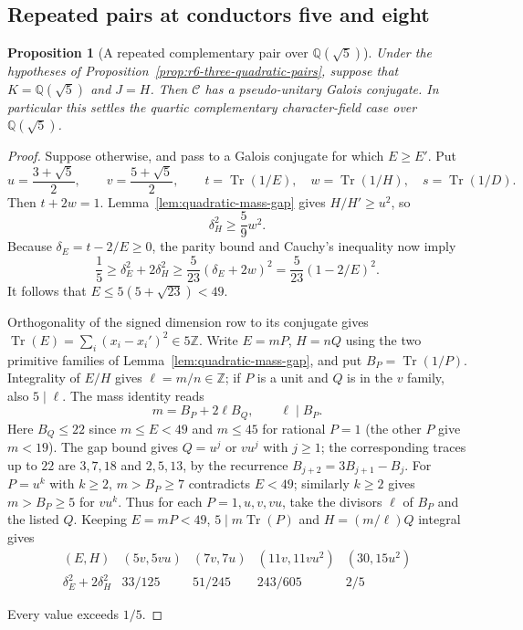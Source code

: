 \documentclass[11pt,reqno]{amsart}
\newtheorem{proposition}[theorem]{Proposition}
\theoremstyle{remark}\newtheorem{remark}[theorem]{Remark}
\numberwithin{equation}{section}
\begin{document}
\subsection{Repeated pairs at conductors five and eight}
\begin{proposition}[A repeated complementary pair over $\mathbb Q(\sqrt5)$]
\label{prop:r6-repeated-pair-five}
Under the hypotheses of Proposition~\ref{prop:r6-three-quadratic-pairs},
suppose that $K=\mathbb Q(\sqrt5)$ and $J=H$.
Then $\mathcal C$ has a pseudo-unitary Galois conjugate.
In particular this settles the quartic complementary character-field
case over $\mathbb Q(\sqrt5)$.
\end{proposition}
\begin{proof}
Suppose otherwise, and pass to a Galois conjugate for which $E\ge E'$.
Put
\[
 u=\frac{3+\sqrt5}{2},\qquad v=\frac{5+\sqrt5}{2},\qquad
 t=\operatorname{Tr}(1/E),\quad w=\operatorname{Tr}(1/H),\quad
 s=\operatorname{Tr}(1/D).
\]
Then $t+2w=1$. Lemma~\ref{lem:quadratic-mass-gap} gives
$H/H'\ge u^2$, so
\[
 \delta_H^2\ge\frac59w^2.
\]
Because $\delta_E=t-2/E\ge0$, the parity bound and Cauchy's inequality
now imply
\[
 \frac15\ge\delta_E^2+2\delta_H^2
 \ge\frac5{23}(\delta_E+2w)^2
 =\frac5{23}(1-2/E)^2.
\]
It follows that $E\le5(5+\sqrt{23})<49$.

Orthogonality of the signed dimension row to its conjugate gives
$\operatorname{Tr}(E)=\sum_i(x_i-x_i')^2\in5\mathbb Z$.
Write $E=mP$, $H=nQ$ using the two primitive families of
Lemma~\ref{lem:quadratic-mass-gap}, and put $B_P=\operatorname{Tr}(1/P)$.
Integrality of $E/H$ gives $\ell=m/n\in\mathbb Z$; if $P$ is a
unit and $Q$ is in the $v$ family, also $5\mid\ell$. The mass
identity reads
\[
     m=B_P+2\ell B_Q,\qquad \ell\mid B_P.
\]
Here $B_Q\le22$ since $m\le E<49$ and $m\le45$ for rational $P=1$
(the other $P$ give $m<19$). The gap bound gives $Q=u^j$ or
$vu^j$ with $j\ge1$; the corresponding traces up to $22$ are
$3,7,18$ and $2,5,13$, by the recurrence $B_{j+2}=3B_{j+1}-B_j$.
For $P=u^k$ with $k\ge2$, $m>B_P\ge7$ contradicts $E<49$;
similarly $k\ge2$ gives $m>B_P\ge5$ for $vu^k$.
Thus for each $P=1,u,v,vu$, take the divisors $\ell$ of $B_P$
and the listed $Q$. Keeping $E=mP<49$, $5\mid m\operatorname{Tr}(P)$
and $H=(m/\ell)Q$ integral gives
\[
\begin{array}{c|cccc}
 (E,H)&(5v,5vu)&(7v,7u)&(11v,11vu^2)&(30,15u^2)\\ \hline
 \delta_E^2+2\delta_H^2&33/125&51/245&243/605&2/5
\end{array}
\]

Every value exceeds $1/5$.
\end{proof}
\end{document}
